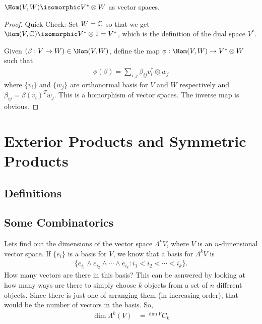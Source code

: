 \begin{theorem}[]
    $\Hom(V,W) \isomorphic V^*\otimes W$ as vector spaces.
\end{theorem}
\begin{proof}
   Quick Check: Set $W=\mathbb{C}$ so that we get $\Hom(V,\CC)\isomorphic V^*\otimes 1 = V^*$, which is the definition of the dual space $V^*$.

   Given $(\beta: V\to W) \in \Hom(V,W)$, define the map $\phi: \Hom(V,W)\to V^* \otimes W $ such that 
   \begin{align}
       \phi(\beta) = \sum_{i,j} \beta_{ij} v_i^* \otimes w_j
   \end{align}
   where $\{v_i\}$ and $\{w_j\}$ are orthonormal basis for $V$ and $W$ respectively and $\beta_{ij} = \beta(v_i)^T w_j$.
   This is a homorphism of vector spaces. The inverse map is obvious.
\end{proof}

\section{Exterior Products and Symmetric Products}
\label{sec:exterior_products_and_symmetric_products}

\subsection{Definitions}
\label{sub:definitions}

\subsection{Some Combinatorics}
\label{sub:some_combinatorics}

Lets find out the dimensions of the vector space $\Lambda^k V$, where $V$ is an $n$-dimensional vector space.
If $\{e_i\}$ is a basis for $V$, we know that a basis for $\Lambda^k V$ is 
\begin{align}
    \{e_{i_1}\wedge e_{i_2} \wedge\cdots \wedge e_{i_k} : i_1 < i_2 < \cdots < i_k \}.
\end{align}
How many vectors are there in this basis? This can be asnwered by looking at how many ways are there to simply choose $k$ objects from a set of $n$ different objects. Since there is just one of arranging them (in increasing order), that would be the number of vectors in the basis. So,
\begin{align}
    \dim \Lambda^k (V) &= {}^{\dim V}C_k
    \label{eqn:dim_exteriorpower}
\end{align}

